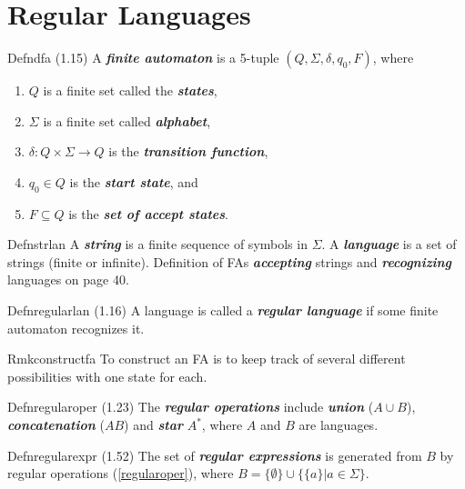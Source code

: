 \chapter{Regular Languages}

\begin{reference}{Defn}{dfa}
  (1.15) A \textbf{\textit{finite automaton}} is a 5-tuple $(Q,\Sigma,\delta,q_0,F)$, where
  \begin{enumerate}
    \item $Q$ is a finite set called the \textbf{\textit{states}},
    \item $\Sigma$ is a finite set called \textbf{\textit{alphabet}},
    \item $\delta:Q\times\Sigma\rightarrow Q$ is the \textbf{\textit{transition function}},
    \item $q_0\in Q$ is the \textbf{\textit{start state}}, and
    \item $F\subseteq Q$ is the \textbf{\textit{set of accept states}}.\qedhere
  \end{enumerate}
\end{reference}

\begin{reference}{Defn}{strlan}
  A \textbf{\textit{string}} is a finite sequence of symbols in $\Sigma$. A \textbf{\textit{language}} is a set of strings (finite or infinite). Definition of FAs \textbf{\textit{accepting}} strings and \textbf{\textit{recognizing}} languages on page 40.
\end{reference}

\begin{reference}{Defn}{regularlan}
  (1.16) A language is called a \textbf{\textit{regular language}} if some finite automaton
  recognizes it.
\end{reference}

\begin{reference}{Rmk}{constructfa}
  To construct an FA is to keep track of several different possibilities with one state for each.
\end{reference}


\begin{reference}{Defn}{regularoper}
  (1.23) The \textbf{\textit{regular operations}} include \textbf{\textit{union}} ($A\cup B$), \textbf{\textit{concatenation}} ($AB$) and \textbf{\textit{star}} $A^*$, where $A$ and $B$ are languages.
\end{reference}

\begin{reference}{Defn}{regularexpr}
  (1.52) The set of \textbf{\textit{regular expressions}} is generated from $B$ by regular operations (\ref{regularoper}), where $B=\{\emptyset\}\cup\{\{a\}|a\in \Sigma\}$.
\end{reference}

